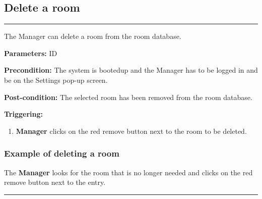 \subsection{Delete a room}
\hrule
\hfill
\vspace{0.5cm}
\label{operation:Delete a room}

The Manager can delete a room from the room database.

\begin{description}

\item \textbf{Parameters:} ID
\item \textbf{Precondition:} The system is bootedup and the Manager has to be
logged in and be on the Settings pop-up screen.
\item \textbf{Post-condition:} The selected room has been removed from the room database.
\item \textbf{Triggering:}
\begin{enumerate}

\item \textbf{Manager} clicks on the red remove button next to the room to be deleted.

\end{enumerate}
\end{description}

\subsubsection{Example of deleting a room}
The \textbf{Manager} looks for the room that is no longer needed and clicks on the red remove button next to the entry.
\hfill
\vspace{0.5cm}
\hrule

 



